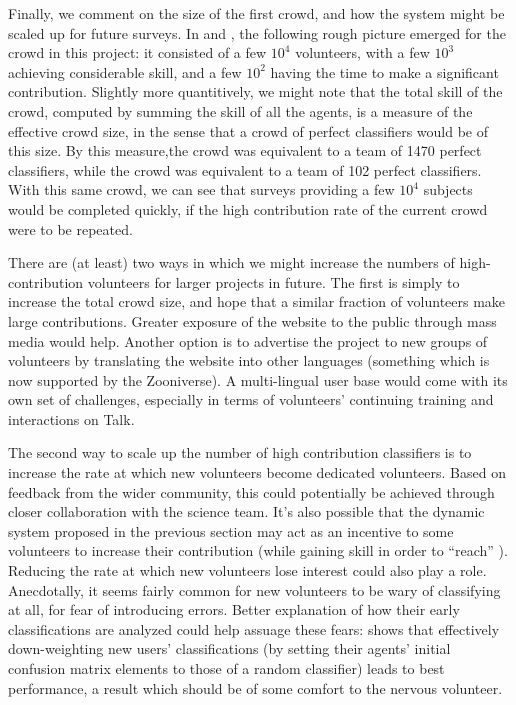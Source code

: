 \documentclass[useAMS,usenatbib,a4paper]{mn2e}
\begin{document}
Finally, we comment on the size of the first \SW crowd, and how the system
might be scaled up for future surveys. In  and
, the following rough picture emerged for the
\SW crowd in this project:
it consisted of a few $10^4$ volunteers, with a few $10^3$ achieving
considerable skill, and a few $10^2$ having the time to make a significant
contribution. Slightly more quantitively, we might note that  the total skill
of the crowd, computed by summing the skill of all the agents, is a measure of
the effective crowd size, in the sense that a crowd of perfect classifiers
would be of this size. By this measure,the \StageOne crowd was equivalent to a
team of 1470 perfect classifiers, while the \StageTwo crowd was equivalent to a
team of 102 perfect classifiers. With this same crowd, we can see that surveys
providing a few $10^4$ subjects would be completed quickly, if the high
contribution rate of the current crowd were to be repeated.

There are (at least) two ways in which we might increase the numbers of
high-contribution volunteers for larger projects in future. The first is
simply to increase the total crowd size, and hope that a similar fraction of
volunteers make large contributions. Greater exposure of the website to the
public through mass media would help. Another option is to advertise the
project to new groups of volunteers by translating the website into other
languages (something which is now supported by the Zooniverse). A
multi-lingual user base would come with its own set of challenges, especially
in terms of volunteers' continuing training and interactions on Talk.

The second way to scale up the number of high contribution classifiers is to
increase the rate at which new volunteers become dedicated volunteers. Based
on feedback from the wider \SW community, this could potentially be achieved
through closer collaboration with the science team. It's also possible that
the dynamic \StageTwo system proposed in the previous section may act as an
incentive to some volunteers to increase their contribution (while gaining
skill in order to ``reach'' \StageTwo). Reducing the rate at which  new
volunteers lose interest could also play a role. Anecdotally, it seems fairly
common for new volunteers to be wary of classifying at all, for fear of
introducing errors. Better explanation of how their early classifications are
analyzed could help assuage these fears:  shows that
effectively down-weighting new users' classifications (by setting their
agents' initial confusion matrix elements to those of a random classifier)
leads to best performance, a result which should be of some comfort to the
nervous volunteer.
\end{document}
